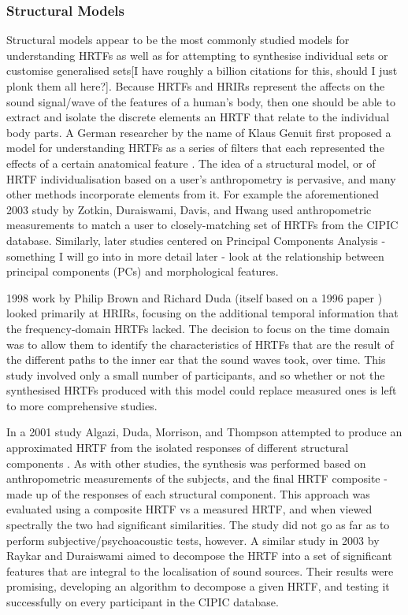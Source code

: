 \subsubsection{Structural Models}
Structural models appear to be the most commonly studied models for understanding HRTFs as well as for attempting to synthesise individual sets or customise generalised sets[I have roughly a billion citations for this, should I just plonk them all here?].  Because HRTFs and HRIRs represent the affects on the sound signal/wave of the features of a human's body, then one should be able to extract and isolate the discrete elements an HRTF that relate to the individual body parts. A German researcher by the name of Klaus Genuit first proposed a model for understanding HRTFs as a series of filters that each represented the effects of a certain anatomical feature \citep{Genuit1984}. The idea of a structural model, or of HRTF individualisation based on a user's anthropometry is pervasive, and many other methods incorporate elements from it. For example the aforementioned 2003 study by Zotkin, Duraiswami, Davis, and Hwang  \citep{Duraiswami2003} used anthropometric measurements to match a user to closely-matching set of HRTFs from the CIPIC database. Similarly, later studies centered on Principal Components Analysis - something I will go into in more detail later - look at the relationship between principal components (PCs) and morphological features. 

1998 work by Philip Brown and Richard Duda \cite{PhillipBrown1998} (itself based on a 1996 paper \cite{lopexmeddis1996}) looked primarily at HRIRs, focusing on the additional temporal information that the frequency-domain HRTFs lacked. The decision to focus on the time domain was to allow them to identify the characteristics of HRTFs that are the result of the different paths to the inner ear that the sound waves took, over time. This study involved only a small number of participants, and so whether or not the synthesised HRTFs produced with this model could replace measured ones is left to more comprehensive studies. 

In a 2001 study Algazi, Duda, Morrison, and Thompson attempted to produce an approximated HRTF from the isolated responses of different structural components \citep{Algazi2001a}. As with other studies, the synthesis was performed based on anthropometric measurements of the subjects, and the final HRTF composite - made up of the responses of each structural component. This approach was evaluated using a composite HRTF vs a measured HRTF, and when viewed spectrally the two had significant similarities. The study did not go as far as to perform subjective/psychoacoustic tests, however. A similar study in 2003 by Raykar and Duraiswami \citep{Raykar2003} aimed to decompose the HRTF into a set of significant features that are integral to the localisation of sound sources. Their results were promising, developing an algorithm to decompose a given HRTF, and testing it successfully on every participant in the CIPIC database. 

